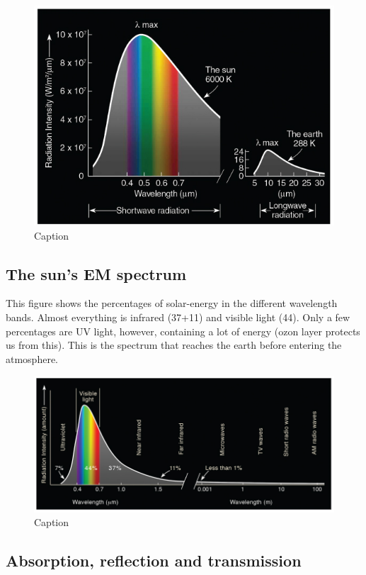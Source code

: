 \documentclass[oneside]{book}
\begin{document}
\begin{figure}

{\centering \includegraphics[width=0.5\linewidth]{figures/Figure121} 

}

\caption{Caption}\label{fig:Laws}
\end{figure}

\subsection{The sun's EM spectrum}\label{the-suns-em-spectrum}

This figure shows the percentages of solar-energy in the different
wavelength bands. Almost everything is infrared (37+11) and visible
light (44). Only a few percentages are UV light, however, containing a
lot of energy (ozon layer protects us from this). This is the spectrum
that reaches the earth before entering the atmosphere.

\begin{figure}

{\centering \includegraphics[width=1\linewidth]{figures/Figure122} 

}

\caption{Caption}\label{fig:Spectrum}
\end{figure}

\subsection{Absorption, reflection and
transmission}\label{absorption-reflection-and-transmission}
\end{document}
